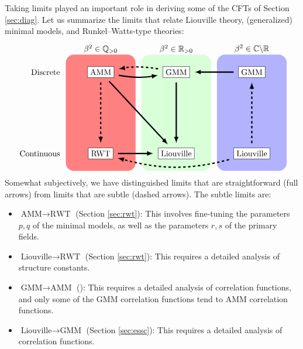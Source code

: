 \documentclass[12pt, a4paper]{article}
\theoremstyle{break}
\begin{document}
Taking limits played an important role in deriving some of the CFTs of Section \ref{sec:diag}. 
Let us summarize the limits that relate Liouville theory, (generalized) minimal models, and Runkel--Watts-type theories: 
\begin{align}
\begin{tikzpicture}[scale = .25, baseline=(current  bounding  box.center)]
\fill[red!50, rounded corners = 10] (-6, -10) rectangle (6, 10);
\fill[green!15, rounded corners = 10] (7, -10) rectangle (19, 10);
\fill[blue!30, rounded corners = 10] (20, -10) rectangle (32, 10);
\node at (0, 11) {$\beta^2\in\mathbb{Q}_{>0}$};
\node at (13, 11) {$\beta^2\in\mathbb{R}_{>0}$};
\node at (26, 11) {$\beta^2\in \mathbb{C}\backslash \mathbb{R}$};
\node[left] at (-6.5, 7) {Discrete};
\node[left] at (-6.5, -7) {Continuous};
\draw (0, 7) node[draw, fill = white] (mm) {AMM};
\draw (13, 7) node[draw, fill = white] (gmm1) {GMM};
\draw (26, 7) node[draw, fill = white] (gmm2) {GMM};
\draw (0, -7) node[draw, fill = white] (rwt) {RWT};
\draw (13, -7) node[draw, fill = white] (clo) {Liouville};
\draw (26, -7) node[draw, fill = white] (liou) {Liouville};
\draw [ultra thick, shorten <= 2mm, shorten >= 2mm, -latex, 
       out = -10, in = -170] (mm) to (gmm1);
\draw [ultra thick, shorten <= 2mm, shorten >= 2mm, -latex, dashed,
       out = 170, in = 10] (gmm1) to (mm);
\draw [ultra thick, shorten <= 2mm, shorten >= 2mm, -latex] (gmm2) to (gmm1);
\draw [ultra thick, shorten <= 2mm, shorten >= 2mm, -latex] (mm) to (clo);
\draw [ultra thick, shorten <= 2mm, shorten >= 2mm, -latex, dashed] (mm) to (rwt);
\draw [ultra thick, shorten <= 2mm, shorten >= 2mm, -latex] (rwt) to (clo);
\draw [ultra thick, shorten <= 2mm, shorten >= 2mm, -latex] (gmm1) to (clo);
\draw [ultra thick, shorten <= 2mm, shorten >= 2mm, -latex,
       out = -165, in = -15, dashed] (liou) to (rwt);
\draw [ultra thick, shorten <= 2mm, shorten >= 2mm, -latex, dashed] (liou) to (gmm2);
\end{tikzpicture}
\label{lims}
\end{align}
Somewhat subjectively, we have distinguished limits that are straightforward (full arrows) from limits that are subtle (dashed arrows). The subtle limits are:
\begin{itemize}
 \item $\boxed{\text{AMM}\to \text{RWT}}$ (Section \ref{sec:rwt}): This involves fine-tuning the parameters $p,q$ of the minimal models, as well as the parameters $r,s$ of the primary fields.
  \item $\boxed{\text{Liouville}\to \text{RWT}}$ (Section \ref{sec:rwt}): This requires a detailed analysis of structure constants. 
 \item $\boxed{\text{GMM}\to \text{AMM}}$ (\cite{rib18}): This requires a detailed analysis of correlation functions, and only some of the GMM correlation functions tend to AMM correlation functions. 
 \item $\boxed{\text{Liouville}\to \text{GMM}}$ (Section \ref{sec:essc}): This requires a detailed analysis of correlation functions.
\end{itemize}
\end{document}
